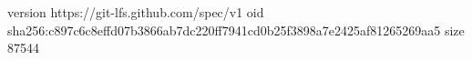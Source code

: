 version https://git-lfs.github.com/spec/v1
oid sha256:c897c6c8effd07b3866ab7dc220ff7941cd0b25f3898a7e2425af81265269aa5
size 87544
